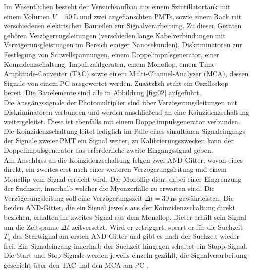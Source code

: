 \noindent Im Wesentlichen besteht der Versuchsaufbau aus einem Szintillatortank
mit einem Volumen $V = \SI{50}{\liter}$ und zwei angeflanschten PMTs, sowie
einem Rack mit verschiedenen elektrischen Bauteilen zur Signalverarbeitung. Zu
diesen Geräten gehören Verzögerungsleitungen (verschieden lange Kabelverbindungen
mit Verzögerunsgleistungen im Bereich einiger Nanosekunden), Diskriminatoren
zur Festlegung von Schwellspannungen, einem Doppelimpulsgenerator, einer
Koinzidenzschaltung, Impulszählgeräten, einem Monoflop, einem
Time-Amplitude-Converter (TAC) sowie einem Multi-Channel-Analyzer (MCA), dessen
Signale von einem PC ausgewertet werden. Zusätzlich steht ein Oszilloskop bereit.
Die Bauelemente sind alle in Abbildung \ref{fig:02} aufgeführt.  \\
\newline
\noindent Die Ausgängssignale der Photomultiplier sind über
Verzögerungsleitungen mit Diskriminatoren verbunden und werden anschließend an
eine Koinzidenzschaltung weitergeleitet. Diese ist ebenfalls mit einem
Doppelimpulsgenerator verbunden. Die Koinzidenzschaltung leitet lediglich im
Falle eines simultanen Signaleingangs der Signale zweier PMT ein Signal weiter,
zu Kalibrierungszwecken kann der Doppelimpulsgenerator das erforderliche zweite
Eingangssignal geben. \\
\noindent Am Anschluss an die Koinzidenzschaltung folgen zwei AND-Gitter, wovon
eines direkt, ein zweites erst nach einer weiteren Verzögerungsleitung und einem
Monoflip vom Signal erreicht wird. Der Monoflip dient dabei einer Eingrenzung
der Suchzeit, innerhalb welcher die Myonzerfälle zu erwarten sind. Die
Verzögerungsleitung soll eine Verzögerungszeit $\Delta t = \SI{30}{\nano\second}$
gewährleisten. Die beiden AND-Gitter, die ein Signal jeweils aus der
Koinzidenzschaltung direkt beziehen, erhalten ihr zweites Signal aus dem
Monoflop. Dieser erhält sein Signal um die Zeitspanne $\Delta t$ zeitversetzt.
Wird er getriggert, sperrt er für die Suchzeit $T_s$ das Startsignal am ersten
AND-Gitter und gibt es nach der Suchzeit wieder frei. Ein Signaleingang
innerhalb der Suchzeit hingegen schaltet ein Stopp-Signal. Die Start und
Stop-Signale werden jeweils einzeln gezählt, die Signalverarbeitung geschieht
über den TAC und den MCA am PC \cite{anleitung}.   
